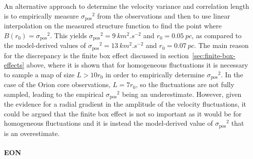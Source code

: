 \documentclass[fleqn,usenatbib, useAMS, a4paper]{mnras}
\newcommand\stopNEW{\color{black}}
\newcommand\pos{\ensuremath{_{\mathrm{pos}}}}
\begin{document}
An alternative approach to determine the velocity variance and correlation length
is to empirically measure \(\sigma\pos^2\) from the observations and then to use linear
interpolation on the measured structure function to find the point where \(B(r_0) = \sigma\pos^2\).
This yields \(\sigma\pos^2 = \SI{9}{km^{2}.s^{-2}}\) and \(r_0 = \SI{0.05}{pc} \),
as compared to the model-derived values of \(\sigma\pos^2 = \SI{13}{km^{2}.s^{-2}}\) and \(r_0 = \SI{0.07}{pc} \).
The main reason for the discrepancy is the finite box effect
discussed in section~\ref{sec:finite-box-effects} above, where it is shown
that for homogeneous fluctuations it is necessary to sample a map of size \(L > 10 r_0\)
in order to empirically determine \(\sigma\pos^2\).
In the case of the Orion core observations, \(L = 7 r_0\),
so the fluctuations are not fully sampled, leading
to the empirical \(\sigma\pos^2\) being an underestimate.
However, given the evidence for a radial gradient in the amplitude of the velocity fluctuations,
it could be argued that the finite box effect is not so important as it would be for homogeneous fluctuations
and it is instead the model-derived value of \(\sigma\pos^2\) that is an overestimate.
\stopNEW


\paragraph*{EON}
\end{document}
